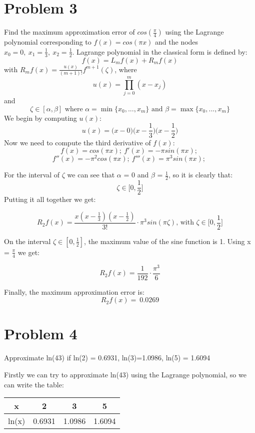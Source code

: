 \documentclass{article}
\begin{document}
\section*{Problem 3}
Find the maximum approximation error of \(cos(\frac{\pi}{4})\) using the Lagrange polynomial corresponding
to \(f(x)=cos(\pi x)\) and the nodes \(x_0=0,\ x_1=\frac{1}{3},\ x_2=\frac{1}{2} \).
\newline
\newline
Lagrange polynomial in the classical form is defined by:
\[
    f(x) = L_mf(x) + R_mf(x)
\]
with \(R_mf(x) = \frac{u(x)}{(m+1)!}f^{m+1}(\zeta)\), where
\[
    u(x) = \prod_{j=0}^{m} (x-x_j)
\]
and
\[
    \zeta \in [\alpha,\beta] \text{ where } \alpha = \min\{x_0,...,x_m\} \text{ and } \beta = \max\{x_0,...,x_m\}
\]
We begin by computing \(u(x)\):
\[
    u(x) = \big(x-0\big)\bigg(x-\frac{1}{3}\bigg)\bigg(x-\frac{1}{2}\bigg)
\]
Now we need to compute the third derivative of \(f(x)\):
\[
    f(x) = cos(\pi x); \
    f'(x) = -\pi sin(\pi x); \
\]
\[
    f''(x) = -\pi^2 cos(\pi x); \
    f'''(x) = \pi^3 sin(\pi x); \
\]

For the interval of \(\zeta\) we can see that \(\alpha\) = 0 and \(\beta\) = \(\frac{1}{2}\), so it is clearly that:
\[
    \zeta \in \bigg[0,\frac{1}{2}\bigg]
\]
Putting it all together we get:

\[
    R_2f(x) = \frac{x(x - \frac{1}{3})(x-\frac{1}{2})}{3!}
    \cdot \pi^3 sin(\pi \zeta)\text{, with } \zeta \in \bigg[0,\frac{1}{2}\bigg]
\]

On the interval \(\zeta \in [0,\frac{1}{2}]\), the maximum value of the sine function is 1. Using x = \(\frac{\pi}{4}\) we get:

\[
    R_2f(x) = \frac{1}{192} \cdot \frac{\pi^3}{6}
\]

Finally, the maximum approximation error is:
\[
    R_2f(x) =~ 0.0269
\]


\section*{Problem 4}
Approximate ln(43) if ln(2) = 0.6931, ln(3)=1.0986, ln(5) = 1.6094
\newline

Firstly we can try to approximate ln(43) using the Lagrange polynomial, so we can write the table:

\begin{center}
    \begin{tabular}{c| c c c}
        x & 2 & 3 & 5 \\
        \hline
        ln(x) & 0.6931 & 1.0986 & 1.6094 \\
    \end{tabular}
\end{center}
\end{document}
